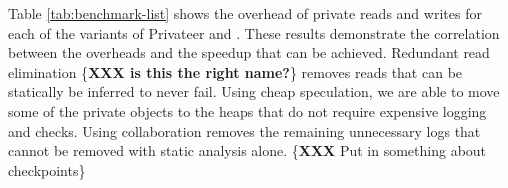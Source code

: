 Table \ref{tab:benchmark-list} shows the overhead of private reads and
writes for each of the variants of Privateer and \namensp. These results
demonstrate the correlation between the overheads and the speedup that can
be achieved. Redundant read elimination \{\textbf{XXX is this the right
name?}\} removes reads that can be statically be inferred to never fail.
Using cheap speculation, we are able to move some of the private objects to
the heaps that do not require expensive logging and checks.
Using collaboration removes the remaining unnecessary logs that cannot
be removed with static analysis alone.
\{\textbf{XXX} Put in something about checkpoints\}

